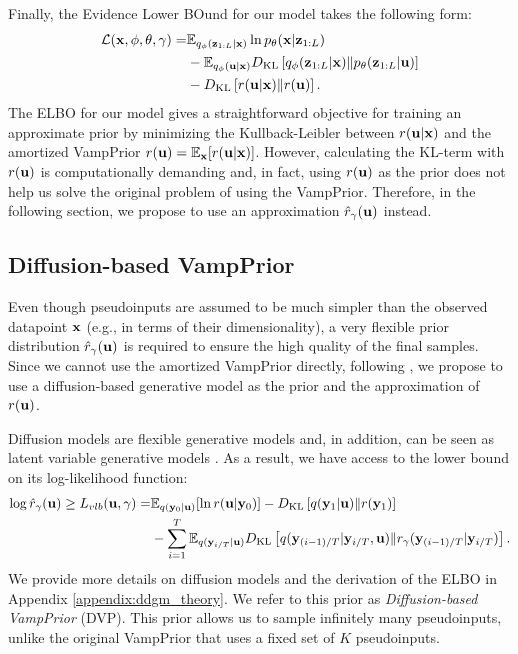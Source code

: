 Finally, the Evidence Lower BOund for our model takes the following form:
\begin{align}\label{eq:our_elbo}
    \mathcal{L}(\rvx, \phi, \theta, \gamma) = 
     &\E_{\Enc{\rvz_{1:L}}{\rvx}} \ln \Dec{\rvx}{\rvz_{1:L}} \\
     &- \E_{q_{\phi}(\rvu|\rvx)}\KL{q_{\phi}(\rvz_{1:L}|\rvx)}{p_{\theta}(\rvz_{1:L}|\rvu)} \\
     &- \KL{r(\rvu|\rvx)}{r(\rvu)}  . 
\end{align}
The ELBO for our model gives a straightforward objective for training an approximate prior by minimizing the Kullback-Leibler between $r({\mathbf{u}}|{\mathbf{x}})$ and the amortized VampPrior $r({\mathbf{u}}) = \mathbb{E}_{{\mathbf{x}}}[r({\mathbf{u}}|{\mathbf{x}})]$. However, calculating the KL-term with $r({\mathbf{u}})$ is computationally demanding and, in fact, using $r({\mathbf{u}})$ as the prior does not help us solve the original problem of using the VampPrior. Therefore, in the following section, we propose to use an approximation $\hat{r}_{\gamma}({\mathbf{u}})$ instead.




 
\subsection{Diffusion-based VampPrior}\label{subsection:diff_prior}
Even though pseudoinputs are assumed to be much simpler than the observed datapoint ${\mathbf{x}}$ (e.g., in terms of their dimensionality), a very flexible prior distribution $\hat{r}_{\gamma}({\mathbf{u}})$ is required to ensure the high quality of the final samples. Since we cannot use the amortized VampPrior directly, following \citep{vahdat2021score, wehenkel2021diffusion}, we propose to use a diffusion-based generative model \citep{ho2020denoising} as the prior and the approximation of $r({\mathbf{u}})$.

Diffusion models are flexible generative models and, in addition, can be seen as latent variable generative models \citep{kingma2021variational}. As a result, we have access to the lower bound on its log-likelihood function: 
\begin{align} \label{eq:5_dvp_diff_elbo}
    \log \hat{r}_{\gamma}(\rvu) \geq L_{vlb}(\rvu, \gamma) = & \E_{q(\rvy_0|\rvu)}[\ln r(\rvu|\rvy_0)]
    - \KL{q(\rvy_1 |\rvu)}{r(\rvy_1)}  \\
    & - \sum_{i=1}^T \E_{q(\rvy_{i/T}|\rvu)} \KL{q(\rvy_{(i-1)/T}|\rvy_{i/T}, \rvu)}{r_{\gamma}(\rvy_{(i-1)/T}|\rvy_{i/T})}. \notag
\end{align}
We provide more details on diffusion models and the derivation of the ELBO in Appendix \ref{appendix:ddgm_theory}. We refer to this prior as \textit{Diffusion-based VampPrior} (DVP). This prior allows us to sample infinitely many pseudoinputs, unlike the original VampPrior that uses a fixed set of $K$ pseudoinputs.

